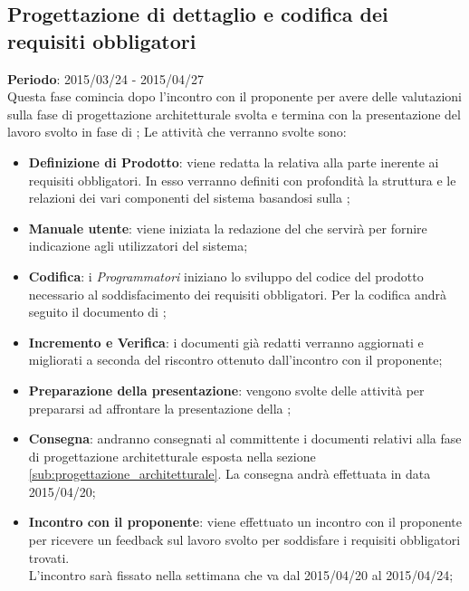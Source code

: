 	\subsection{Progettazione di dettaglio e codifica dei requisiti obbligatori} %
	\label{sub:progettazione_di_dettaglio_e_codifica_dei_requisiti_obbligatori}
	\textbf{Periodo}:  2015/03/24 - 2015/04/27 \\
	Questa fase comincia dopo l'incontro con il proponente per avere delle valutazioni sulla fase di progettazione architetturale svolta e termina con la presentazione del lavoro svolto in fase di \RPmin;
	Le attività che verranno svolte sono:
		\begin{itemize}
			\item \textbf{Definizione di Prodotto}: viene redatta la \docNameVersionDdP{} relativa alla parte inerente ai requisiti obbligatori. In esso verranno definiti con profondità la struttura e le relazioni dei vari componenti del sistema basandosi sulla \docNameVersionST;
			\item \textbf{Manuale utente}: viene iniziata la redazione del \docNameVersionMU{} che servirà per fornire indicazione agli utilizzatori del sistema;
			\item \textbf{Codifica}: i \emph{Programmatori} iniziano lo sviluppo del codice del prodotto necessario al soddisfacimento dei requisiti obbligatori. Per la codifica andrà seguito il documento di \docNameVersionDdP;
			\item \textbf{Incremento e Verifica}: i documenti già redatti verranno aggiornati e migliorati a seconda del riscontro ottenuto dall'incontro con il proponente;
			\item \textbf{Preparazione della presentazione}: vengono svolte delle attività per prepararsi ad affrontare la presentazione della \RPmin;
			\item \textbf{Consegna}: andranno consegnati al committente i documenti relativi alla fase di progettazione architetturale esposta nella sezione \ref{sub:progettazione_architetturale}. La consegna andrà effettuata in data 2015/04/20;
			\item \textbf{Incontro con il proponente}: viene effettuato un incontro con il proponente per ricevere un feedback sul lavoro svolto per soddisfare i requisiti obbligatori trovati. \\
			L'incontro sarà fissato nella settimana che va dal 2015/04/20 al 2015/04/24;
		\end{itemize}
		

